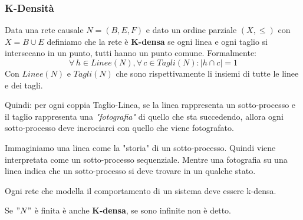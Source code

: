 \subsubsection{K-Densità}
\begin{definizione}
  Data una rete causale $N=(B, E, F)$ e dato un ordine parziale $(X, \leq)$ con
  $X=B\cup E$ definiamo che la rete è \textbf{K-densa} se ogni linea e ogni
  taglio si intersecano in un punto, tutti hanno un punto comune. Formalmente:
  \[\forall\, h\in Linee(N),\forall\, c\in Tagli(N):|h\cap c|=1\]
  Con $Linee(N)$ e $Tagli(N)$ che sono rispettivamente li insiemi di tutte le
  linee e dei tagli.\\
  \end{definizione} \vspace{5mm} %
  \begin{nota}
    Quindi: per ogni coppia Taglio-Linea, se la linea rappresenta un sotto-processo e il taglio rappresenta una \textit{"fotografia"} di quello che sta succedendo, allora ogni sotto-processo deve incrociarci con quello che viene fotografato.
  \end{nota}
  \begin{nota}
  Immaginiamo una linea come la "storia" di un sotto-processo. Quindi viene interpretata come un sotto-processo sequenziale. Mentre una fotografia su una linea indica che un sotto-processo si deve trovare in un qualche stato.
  \end{nota}
\begin{nota}
Ogni rete che modella il comportamento di un sistema deve essere k-densa.
\end{nota}
  \begin{nota}
  Se $"N"$ è finita è anche \textbf{K-densa}, se sono infinite non è detto.
\end{nota}
